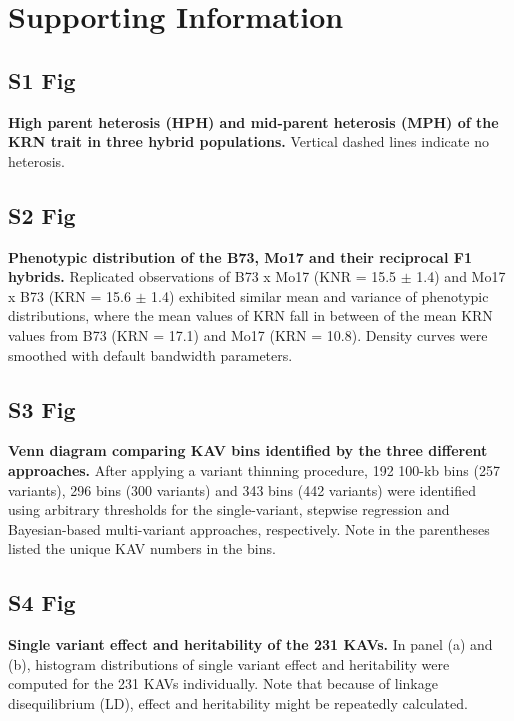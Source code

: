 \documentclass[10pt,letterpaper]{article}
\begin{document}


\section*{Supporting Information}


\subsection*{S1 Fig}
\label{Fig_S1}
{\bf High parent heterosis (HPH) and mid-parent heterosis (MPH) of the KRN trait in three hybrid populations.} Vertical dashed lines indicate no heterosis.

\subsection*{S2 Fig}
\label{Fig_S2}
{\bf Phenotypic distribution of the B73, Mo17 and their reciprocal F1 hybrids.} Replicated observations of B73 x Mo17 (KNR = 15.5 $\pm$ 1.4) and Mo17 x B73 (KRN = 15.6 $\pm$ 1.4) exhibited similar mean and variance of phenotypic distributions, where the mean values of KRN fall in between of the mean KRN values from B73 (KRN = 17.1) and Mo17 (KRN = 10.8). Density curves were smoothed with default bandwidth parameters.

\subsection*{S3 Fig}
\label{Fig_S3}
{\bf Venn diagram comparing KAV bins identified by the three different approaches.} After applying a variant thinning procedure, 192 100-kb bins (257 variants), 296 bins (300 variants) and 343 bins (442 variants) were identified using arbitrary thresholds for the single-variant, stepwise regression and Bayesian-based multi-variant approaches, respectively. Note in the parentheses listed the unique KAV numbers in the bins.

\subsection*{S4 Fig}
\label{Fig_S4}
{\bf Single variant effect and heritability of the 231 KAVs.} In panel (a) and (b), histogram distributions of single variant effect and heritability were computed for the 231 KAVs individually. Note that because of linkage disequilibrium (LD), effect and heritability might be repeatedly calculated.
\end{document}
